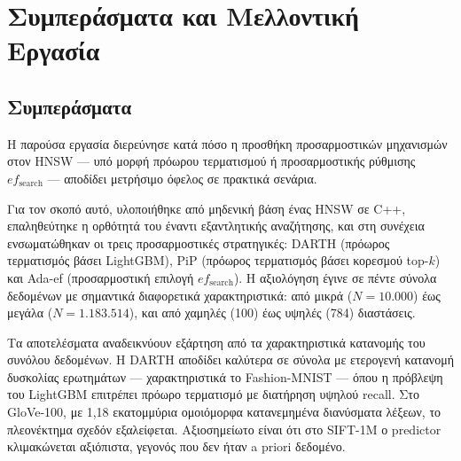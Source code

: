 \documentclass[12pt,a4paper]{article}
\begin{document}
\section{Συμπεράσματα και Μελλοντική Εργασία}

\subsection{Συμπεράσματα}

Η παρούσα εργασία διερεύνησε κατά πόσο η προσθήκη προσαρμοστικών μηχανισμών στον HNSW --- υπό μορφή πρόωρου τερματισμού ή προσαρμοστικής ρύθμισης $ef_{\text{search}}$ --- αποδίδει μετρήσιμο όφελος σε πρακτικά σενάρια.

Για τον σκοπό αυτό, υλοποιήθηκε από μηδενική βάση ένας HNSW σε C++, επαληθεύτηκε η ορθότητά του έναντι εξαντλητικής αναζήτησης, και στη συνέχεια ενσωματώθηκαν οι τρεις προσαρμοστικές στρατηγικές: DARTH (πρόωρος τερματισμός βάσει LightGBM), PiP (πρόωρος τερματισμός βάσει κορεσμού top-$k$) και Ada-ef (προσαρμοστική επιλογή $ef_{\text{search}}$). Η αξιολόγηση έγινε σε πέντε σύνολα δεδομένων με σημαντικά διαφορετικά χαρακτηριστικά: από μικρά ($N=10.000$) έως μεγάλα ($N=1.183.514$), και από χαμηλές (100) έως υψηλές (784) διαστάσεις.

Τα αποτελέσματα αναδεικνύουν εξάρτηση από τα χαρακτηριστικά κατανομής του συνόλου δεδομένων. Η DARTH αποδίδει καλύτερα σε σύνολα με ετερογενή κατανομή δυσκολίας ερωτημάτων --- χαρακτηριστικά το Fashion-MNIST --- όπου η πρόβλεψη του LightGBM επιτρέπει πρόωρο τερματισμό με διατήρηση υψηλού recall. Στο GloVe-100, με 1,18 εκατομμύρια ομοιόμορφα κατανεμημένα διανύσματα λέξεων, το πλεονέκτημα σχεδόν εξαλείφεται. Αξιοσημείωτο είναι ότι στο SIFT-1M ο predictor κλιμακώνεται αξιόπιστα, γεγονός που δεν ήταν a priori δεδομένο.
\end{document}
